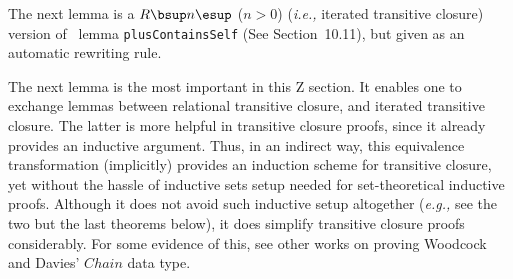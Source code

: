 

The next lemma is a $R\bsup n \esup$ ($n > 0$) (\textit{i.e.,} iterated transitive closure)
version of \zeves\ lemma \texttt{plusContainsSelf} (See Section~10.11), but given as an
automatic rewriting rule.
%

The next lemma is the most important in this Z section. It enables one
to exchange lemmas between relational transitive closure, and iterated
transitive closure. The latter is more helpful in transitive closure
proofs, since it already provides an inductive argument. Thus, in an
indirect way, this equivalence transformation (implicitly) provides an
induction scheme for transitive closure, yet without the hassle of
inductive sets setup needed for set-theoretical inductive proofs.
Although it does not avoid such inductive setup altogether (\textit{e.g.,}
see the two but the last theorems below), it does simplify transitive
closure proofs considerably. For some evidence of this, see other works
on proving Woodcock and Davies' $Chain$ data type.
%

